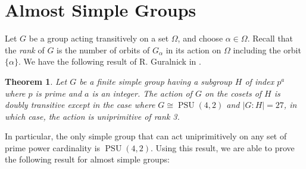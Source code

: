 \documentclass[12pt]{amsart}
\newtheorem{theorem}{Theorem}[section]
\theoremstyle{definition}
\DeclareMathOperator{\PSU}{PSU}
\begin{document}
\section{Almost Simple Groups}

Let $G$ be a group acting transitively on a set $\Omega$, and choose $\alpha \in \Omega$. Recall that the \emph{rank} of $G$ is the number of orbits of $G_\alpha$ in its action on $\Omega$ including the orbit $\{\alpha\}$. We have the following result of R. Guralnick in \cite[Corollary 2]{Gur}.
\begin{theorem}
	Let $G$ be a finite simple group having a subgroup $H$ of index $p^a$ where $p$ is prime and $a$ is an integer. The action of $G$ on the cosets of $H$ is doubly transitive except in the case where $G \cong \PSU(4,2)$ and $|G:H| = 27$, in which case, the action is uniprimitive of rank 3. 
\end{theorem}

In particular, the only simple group that can act uniprimitively on any set of prime power cardinality is $\PSU(4,2)$. Using this result, we are able to prove the following result for almost simple groups:
\end{document}
